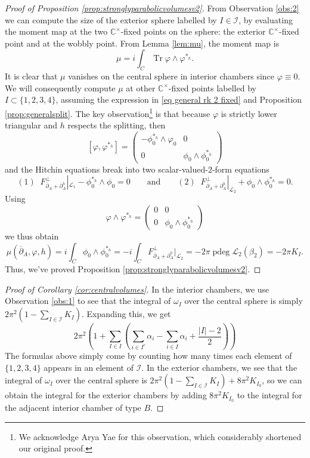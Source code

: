 \documentclass[12pt,letterpaper,reqno]{amsart}
\theoremstyle{remark}
\theoremstyle{definition}
\numberwithin{thm}{section}
\numberwithin{equation}{section}
\numberwithin{figure}{section}
\newcommand{\cL}{\ensuremath{\mathcal L}}
\newcommand{\C}{\ensuremath{\mathbb C}}
\newcommand{\delbar}{\ensuremath{\overline{\partial}}}
\newcommand{\del}{{\partial}}
\DeclareMathOperator{\Tr}{Tr}
\DeclareMathOperator{\pdeg}{pdeg}
\begin{document}
\begin{proof}[Proof of Proposition \ref{prop:stronglyparabolicvolumesv2}]
    From Observation \ref{obs:2} we can compute the size of the exterior sphere labelled by $I \in \mathcal{I}$, by evaluating the moment map at the two $\C^\times$-fixed points on the sphere: the exterior $\C^\times$-fixed point and at the wobbly point.  From Lemma \ref{lem:mu}, the moment map is 
\[\mu =  i \int_C \Tr \varphi \wedge \varphi^{*_h}.\]
     It is clear that $\mu$ vanishes on the central sphere in interior chambers since $\varphi \equiv 0$. We will consequently compute $\mu$ at other $\C^\times$-fixed points labelled by $I \subset \{1, 2, 3,4 \}$, assuming the expression in \eqref{eq general rk 2 fixed} and Proposition \ref{prop:generalsplit}. The key observation\footnote{We acknowledge Arya Yae for this observation, which considerably shortened our original proof.} is that because $\varphi$ is strictly lower triangular and $h$ respects the splitting, then 
     \[
     [ \varphi, \varphi^{*_h}] = \begin{pmatrix} - \phi_0^{*_h} \wedge \varphi_0 & 0 \\ 
 0 & \phi_0 \wedge \phi_0^{*_h}	
 \end{pmatrix}
     \]
     and the Hitchin equations break into two scalar-valued-$2$-form equations 
     \[
      (1) \;\;F^\perp_{\delbar_A + \del_A^h}|_{\cL_1} - \phi_0^{*_h} \wedge \phi_0=0 \qquad \text{and} \qquad (2) \;\; F^\perp_{\delbar_A + \del_A^h}|_{\cL_2} + \phi_0 \wedge \phi_0^{*_h}=0.  
    \] 
     Using
     \[
      \varphi \wedge \varphi^{*_h} = \begin{pmatrix} 0 & 0 \\ 
 0 & \phi_0 \wedge \phi_0^{*_h}	
 \end{pmatrix}
     \]
     we thus obtain
    \begin{equation}
      \mu(\delbar_A, \varphi, h) =  i \int_C \phi_0 \wedge \phi_0^{*_h}
      = -i \int_C F^\perp_{\delbar_A + \del_A^h}|_{\cL_2} 
      =-2 \pi  \pdeg \cL_2(\beta_2)   
      = -2 \pi K_I.
    \end{equation}
Thus, we've proved Proposition \ref{prop:stronglyparabolicvolumesv2}.
    \end{proof}


  
  \begin{proof}[Proof of Corollary  \ref{cor:centralvolumes}]
In the interior chambers, we use Observation \ref{obs:1} to see that the integral of $\omega_I$ over the central sphere is simply $2\pi^2 (1- \sum_{I \in \mathcal{I}} K_I)$. Expanding this, we get 
  \[2 \pi^2 \left(1+ \sum_{I \in I}\left(\sum_{i \in I^c} \alpha_i - \sum_{i \in I} \alpha_i + \frac{|I|-2}{2}\right)\right)\]
The formulas above simply come by counting how many times each element of $\{1, 2, 3, 4\}$ appears in an element of $\mathcal{I}$.
In the exterior chambers, we see that the integral of $\omega_I$ over the central sphere is $2\pi^2 (1 - \sum_{I \in \mathcal{I}} K_I) +  8 \pi^2 K_{I_0}$, so we can obtain the integral for the exterior chambers by adding $8 \pi^2 K_{I_0}$ to the integral for the adjacent interior chamber of type $B$.
\end{proof}
\end{document}
